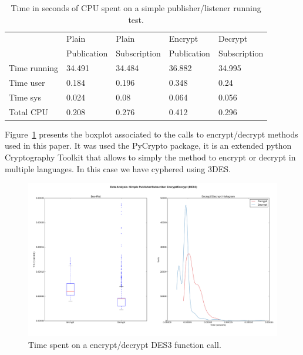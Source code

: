 \documentclass[journal,twoside]{JoPhA}
\begin{document}

\begin{table}[h]
	\centering
	\caption{Time in seconds of CPU spent on a simple publisher/listener running test.}
	\label{tab:time_simple_text_hellow_CPU}
	\begin{tabular}{|l|l|l|l|l|}
		\hline
&		Plain&	Plain&	Encrypt&	Decrypt \\
&		Publication&Subscription&Publication&Subscription \\\hline
Time running&34.491&	34.484&	36.882&	34.995 \\\hline
Time user&0.184&	0.196&	0.348&	0.24 \\\hline
Time sys&0.024&	0.08&	0.064&	0.056 \\\hline
Total CPU&0.208&	0.276&	0.412&	0.296 \\\hline

	\end{tabular}
\end{table}

Figure~\ref{fig:time_simple_text_CPU} presents the boxplot associated to the calls to encrypt/decrypt methods used in this paper. It was used the PyCrypto package, it is an extended python Cryptography Toolkit that allows to simply the method to encrypt or decrypt in multiple languages. In this case we have cyphered using 3DES.

\begin{figure}[ht!]
	\centering
	\includegraphics[width=.5\textwidth]{figure_Simple_Publisher_subscriber.png}
	\caption{Time spent on a encrypt/decrypt DES3 function call.}
	\label{fig:time_simple_text_CPU}
\end{figure}
\end{document}
